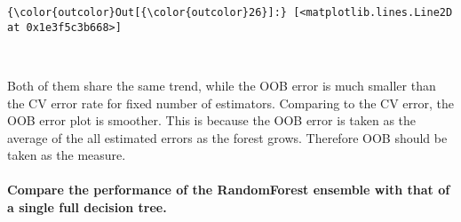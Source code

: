 \documentclass[11pt]{article}
\begin{document}
            \begin{Verbatim}[commandchars=\\\{\}]
{\color{outcolor}Out[{\color{outcolor}26}]:} [<matplotlib.lines.Line2D at 0x1e3f5c3b668>]
\end{Verbatim}
        
    \begin{center}
    \end{center}
    { \hspace*{\fill} \\}
    
    Both of them share the same trend, while the OOB error is much smaller
than the CV error rate for fixed number of estimators. Comparing to the
CV error, the OOB error plot is smoother. This is because the OOB error
is taken as the average of the all estimated errors as the forest grows.
Therefore OOB should be taken as the measure.

    \paragraph{Compare the performance of the RandomForest ensemble with
that of a single full decision
tree.}\label{compare-the-performance-of-the-randomforest-ensemble-with-that-of-a-single-full-decision-tree.}
\end{document}
